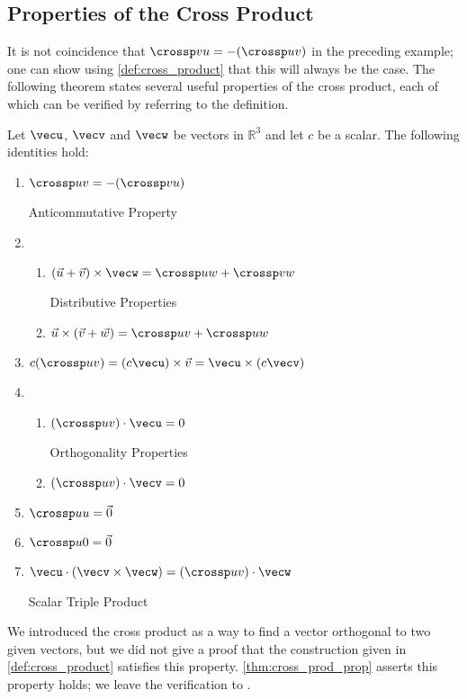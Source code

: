 \subsection{Properties of the Cross Product}

It is not coincidence that $\crossp vu = -(\crossp uv)$ in the preceding example; one can show using \autoref{def:cross_product} that this will always be the case. The following theorem states several useful properties of the cross product, each of which can be verified by referring to the definition.

{
\begin{theorem}\label{thm:cross_prod_prop}
Let $\vecu$, $\vecv$ and $\vecw$ be vectors in $\mathbb{R}^3$ and let $c$ be a scalar. The following identities hold:
\begin{enumerate}
	\item \parbox{167pt}{$\crossp uv = -(\crossp vu)$} Anticommutative Property
	\item	\begin{enumerate}
		\item \parbox{145pt}{$(\vec u+\vec v)\times \vecw = \crossp uw+\crossp vw$} Distributive Properties
		\item	$\vec u \times (\vec v+\vec w) = \crossp uv+\crossp uw$
	\end{enumerate}
	\item		$c(\crossp uv) = (c\vecu) \times \vec v = \vecu \times (c\vecv)$
	\item		\begin{enumerate}
		\item \parbox{145pt}{$(\crossp uv)\cdot \vecu = 0$} Orthogonality Properties
		\item	$(\crossp uv)\cdot \vecv = 0$
	\end{enumerate}
	\item		$\crossp uu = \vec 0$
	\item		$\crossp u0 = \vec 0$
	\item		\parbox{167pt}{$\vecu \cdot (\vecv\times\vecw) = (\crossp uv)\cdot \vecw$} Scalar Triple Product
\end{enumerate}
\end{theorem}
}

We introduced the cross product as a way to find a vector orthogonal to two given vectors, but we did not give a proof that the construction given in \autoref{def:cross_product} satisfies this property. \autoref{thm:cross_prod_prop} asserts this property holds; we leave the verification to .

